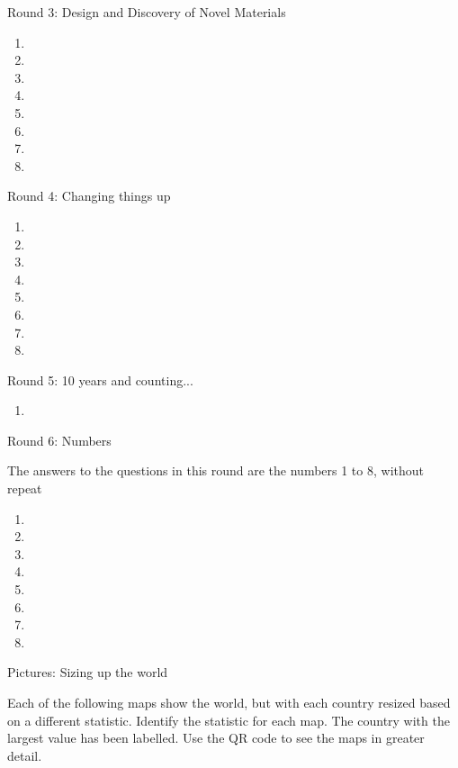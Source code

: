 \newpage
\begin{center}
\Huge
Round 3: Design and Discovery of Novel Materials
\end{center}
\large
\Huge
\begin{enumerate}
\item
\item
\item
\item
\item
\item
\item
\item
\end{enumerate}

\newpage
\begin{center}
\Huge
Round 4: Changing things up
\end{center}
\large
\Huge
\begin{enumerate}
\item
\item
\item
\item
\item
\item
\item
\item
\end{enumerate}

\newpage
\begin{center}
\Huge
Round 5: 10 years and counting...
\end{center}
\large
\Huge
\begin{enumerate}
\item
\end{enumerate}

\newpage
\begin{center}
\Huge
Round 6: Numbers
\end{center}
\large
The answers to the questions in this round are the numbers 1 to 8, without repeat

\Huge
\begin{enumerate}
\item
\item
\item
\item
\item
\item
\item
\item
\end{enumerate}

\newpage
\begin{center}
\Huge
Pictures: Sizing up the world
\end{center}
\large
Each of the following maps show the world, but with each country resized based on a different statistic. Identify the statistic for each map. The country with the largest value has been labelled. Use the QR code to see the maps in greater detail.

